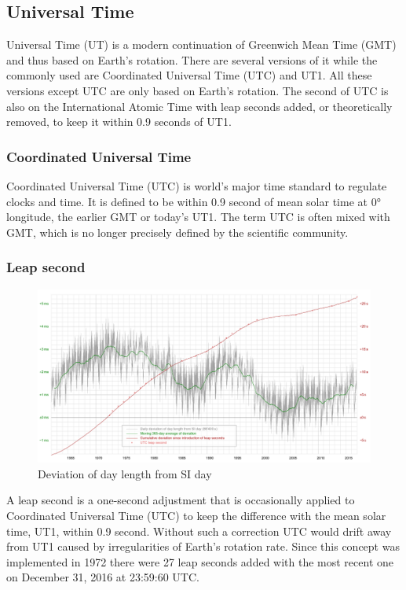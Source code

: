 \subsection{Universal Time}

Universal Time (UT) is a modern continuation of Greenwich Mean Time (GMT) and thus based on Earth’s rotation. There are several versions of it while the commonly used are Coordinated Universal Time (UTC) and UT1. All these versions except UTC are only based on Earth’s rotation. The second of UTC is also on the International Atomic Time with leap seconds added, or theoretically removed, to keep it within 0.9 seconds of UT1.

\subsubsection{Coordinated Universal Time}

Coordinated Universal Time (UTC) is world’s major time standard to regulate clocks and time. It is defined to be within 0.9 second of mean solar time at 0° longitude, the earlier GMT or today's UT1. The term UTC is often mixed with GMT, which is no longer precisely defined by the scientific community.

\subsubsection{Leap second}

\begin{figure}[tb]
	\centering
	\includegraphics[width=1.0\textwidth]{figures/leap_second.png}
	\caption{Deviation of day length from SI day}
	\label{fig:leap_second}
\end{figure}

A leap second is a one-second adjustment that is occasionally applied to Coordinated Universal Time (UTC) to keep the difference with the mean solar time, UT1, within 0.9 second. Without such a correction UTC would drift away from UT1 caused by irregularities of Earth’s rotation rate. Since this concept was implemented in 1972 there were 27 leap seconds added with the most recent one on December 31, 2016 at 23:59:60 UTC.

